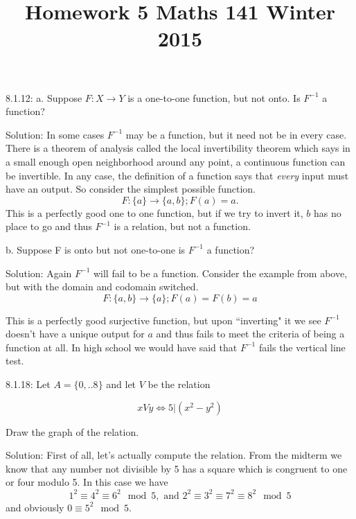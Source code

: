 \documentclass[16 pt]{amsart}
\theoremstyle{definition}
\theoremstyle{remark}
\numberwithin{equation}{section}
\begin{document}
\title{Homework 5 Maths 141 Winter 2015}
\maketitle 

8.1.12: a. Suppose $F:X\rightarrow Y$ is a one-to-one function, but not onto.  Is $F^{-1}$ a function?

\vspace{.5in}

Solution: In some cases $F^{-1}$ may be a function, but it need not be in every case.  There is a theorem of analysis called the local invertibility theorem which says in a small enough open neighborhood around any point, a continuous function can be invertible.  In any case, the definition of a function says that \emph{every} input must have an output.  So consider the simplest possible function.
\[
F : \{a\} \rightarrow \{a,b\}; F(a) = a.
\]
This is a perfectly good one to one function, but if we try to invert it, $b$ has no place to go and thus $F^{-1}$ is a relation, but not a function.

\vspace{.5in}

b. Suppose F is onto but not one-to-one is $F^{-1}$ a function?

\vspace{.5in}

Solution:  Again $F^{-1}$ will fail to be a function.  Consider the example from above, but with the domain and codomain switched.
\[
F:\{a,b\} \rightarrow \{a\}; F(a)=F(b)=a
\]

This is a perfectly good surjective function, but upon ``inverting" it we see $F^{-1}$ doesn't have a unique output for $a$ and thus fails to meet the criteria of being a function at all.  In high school we would have said that $F^{-1}$ fails the vertical line test.   

\newpage

8.1.18:  Let $A=\{0,..8\}$ and let $V$ be the relation

\[
xVy \iff 5|(x^2-y^2)
\]


Draw the graph of the relation.

\vspace{1in}

Solution: First of all, let's actually compute the relation.  From the midterm we know that any number not divisible by 5 has a square which is congruent to one or four modulo 5.  In this case we have
\[
1^2 \equiv 4^2 \equiv 6^2 \mod{5}, \text{ and } 2^2\equiv 3^2 \equiv 7^2 \equiv 8^2 \mod{5}
\]
and obviously $0\equiv 5^2\mod{5}$.
\end{document}
